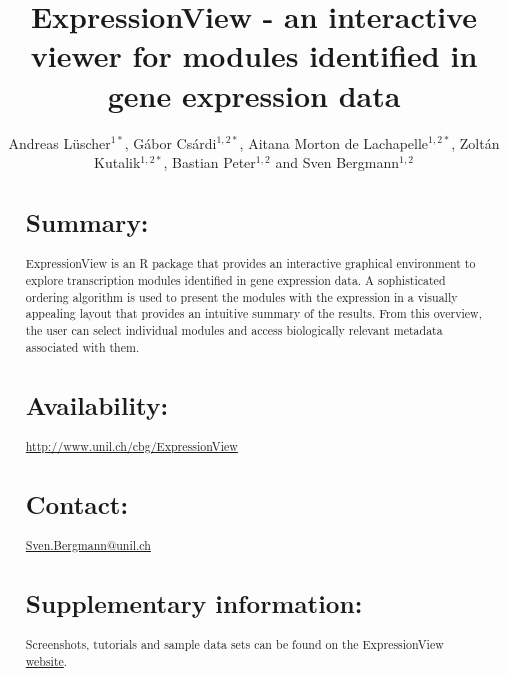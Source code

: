 \documentclass[round]{bioinfo}
\begin{document}
\application{}
\title[ExpressionView]{ExpressionView - an interactive viewer for
  modules identified in gene expression data}
\author[Andreas L\"uscher, G\'abor Cs\'ardi, Aitana Morton de
Lachapelle, Zolt\'an Kutalik, and Sven Bergmann]{Andreas
  L\"uscher$^{1*}$, G\'abor Cs\'ardi$^{1,2*}$, Aitana Morton de
  Lachapelle$^{1,2*}$, Zolt\'an Kutalik$^{1,2*}$,
  Bastian Peter$^{1,2}$
  and Sven Bergmann$^{1,2}$}
\address{
  $^{1}$Swiss Institute of Bioinformatics, Lausanne, Switzerland\\
  $^{2}$Department of Medical Genetics, University of Lausanne,
  Lausanne, Switzerland\\
  *: equal contribution
}



\maketitle

\begin{abstract}
\section{Summary:}
ExpressionView is an R package that provides an interactive graphical
environment to explore transcription modules identified in gene expression
data. A sophisticated ordering algorithm is used to present the
modules with the expression in a visually appealing layout that provides an intuitive
summary of the results. From this overview, the user can select
individual modules and access biologically relevant metadata
associated with them.

\section{Availability:}
\url{http://www.unil.ch/cbg/ExpressionView}

\section{Contact:} \href{Sven.Bergmann@unil.ch}{Sven.Bergmann@unil.ch}

\section{Supplementary information:}
Screenshots, tutorials and sample data sets can be found on the
ExpressionView \href{http://www.unil.ch/cbg/ExpressionView}{website}.
\end{abstract}
\end{document}
